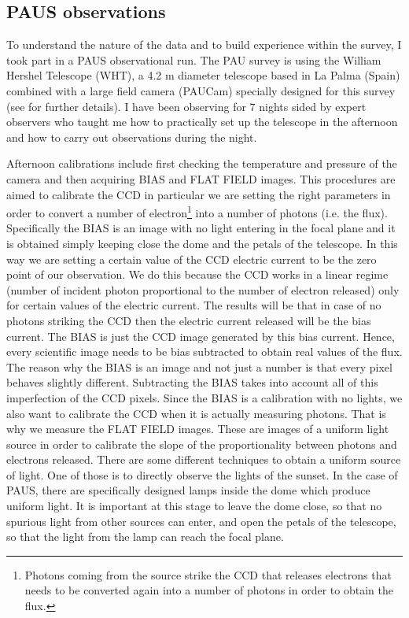 \documentclass[11pt]{article}
\begin{document}
\subsection{PAUS observations}
\label{sub:PAU_obs}
To understand the nature of the data and to build experience within the survey, I took part in a PAUS observational run. 
The PAU survey is using the William Hershel Telescope (WHT), a 4.2 m diameter telescope based in La Palma (Spain) combined with a large field camera (PAUCam) specially designed for this survey (see \citealt{castander12} for further details). 
I have been observing for 7 nights sided by expert observers who taught me how to practically set up the telescope in the afternoon and how to carry out observations during the night. 

Afternoon calibrations include first checking the temperature and pressure of the camera and then acquiring BIAS and FLAT FIELD images. This procedures are aimed to calibrate the CCD in particular we are setting the right parameters in order to convert a number of electron\footnote{Photons coming from the source strike the CCD that releases electrons that needs to be converted again into a number of photons in order to obtain the flux.} into a number of photons (i.e. the flux). Specifically the BIAS is an image with no light entering in the focal plane and it is obtained simply keeping close the dome and the petals of the telescope. In this way we are setting a certain value of the CCD electric current to be the zero point of our observation. We do this because the CCD works in a linear regime (number of incident photon proportional to the number of electron released) only for certain values of the electric current. The results will be that in case of no photons striking the CCD then the electric current released will be the bias current. The BIAS is just the CCD image generated by this bias current. Hence, every scientific image needs to be bias subtracted to obtain real values of the flux. The reason why the BIAS is an image and not just a number is that every pixel behaves slightly different. Subtracting the BIAS takes into account all of this imperfection of the CCD pixels. Since the BIAS is a calibration with no lights, we also want to calibrate the CCD when it is actually measuring photons. That is why we measure the FLAT FIELD images. These are images of a uniform light source in order to calibrate the slope of the proportionality between photons and electrons released. There are some different techniques to obtain a uniform source of light. One of those is to directly observe the lights of the sunset. In the case of PAUS, there are specifically designed lamps inside the dome which produce uniform light. It is important at this stage to leave the dome close, so that no spurious light from other sources can enter, and open the petals of the telescope, so that the light from the lamp can reach the focal plane. 
\end{document}
